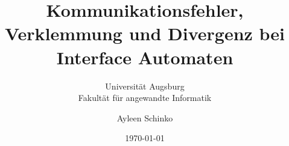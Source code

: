 \begin{titlepage}
  \titlehead{\center{}Bachelorarbeit\\
im Studiengang Bachelor Informatik}
\title{Kommunikationsfehler, Verklemmung und Divergenz bei Interface
Automaten}
\date{\today}
\author{Ayleen Schinko}
\subtitle{\vspace{1cm}Universität Augsburg\\
Fakultät für angewandte Informatik}

\maketitle
\end{titlepage}
